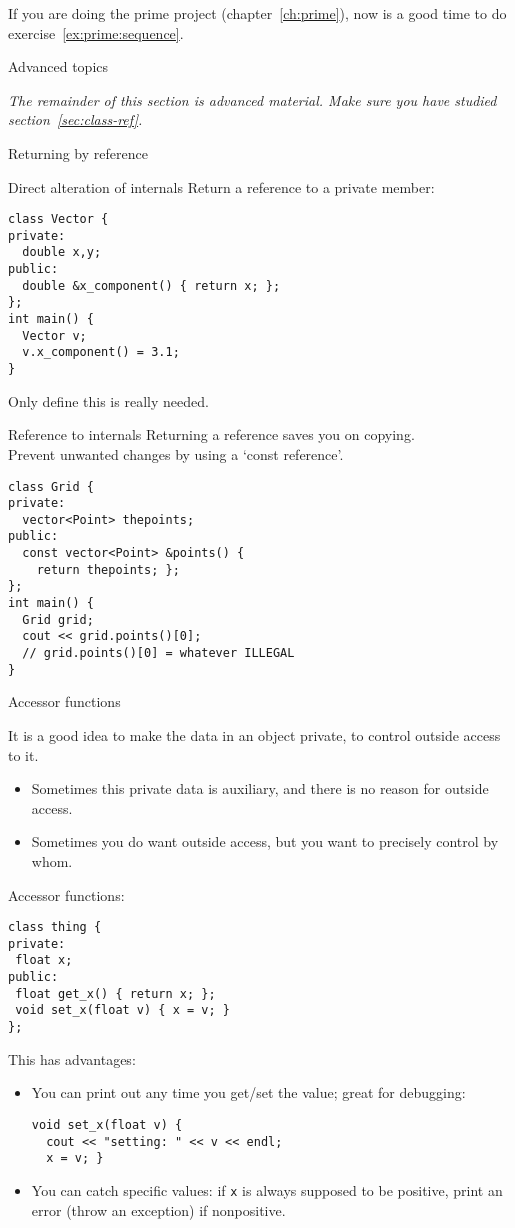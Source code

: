 \begin{exercise}
  If you are doing the prime project (chapter~\ref{ch:prime}),
  now is a good time to do exercise~\ref{ex:prime:sequence}.
\end{exercise}



 {Advanced topics}

\emph{The remainder of this section is advanced material. Make sure
  you have studied section~\ref{sec:class-ref}.}

 {Returning by reference}

\begin{block}{Direct alteration of internals}
  \label{sl:obj-return-ref}
  Return a reference to a private member:
\begin{lstlisting}
class Vector {
private:
  double x,y;
public:
  double &x_component() { return x; };
};
int main() {
  Vector v;
  v.x_component() = 3.1;
}
\end{lstlisting}
Only define this is really needed.
\end{block}

\begin{block}{Reference to internals}
  \label{sl:obj-return-const-ref}
  Returning a reference saves you on copying.\\
  Prevent unwanted changes by using a `const reference'.
\begin{lstlisting}
class Grid {
private:
  vector<Point> thepoints;
public:
  const vector<Point> &points() {
    return thepoints; };
};
int main() {
  Grid grid;
  cout << grid.points()[0];
  // grid.points()[0] = whatever ILLEGAL
}
\end{lstlisting}
\end{block}

 {Accessor functions}

It is a good idea to make the data in an object private,
to control outside access to it.
\begin{itemize}
\item Sometimes this private data is auxiliary, and there is no reason
  for outside access.
\item Sometimes you do want outside access, but you want to precisely
  control by whom.
\end{itemize}

Accessor functions:
\begin{lstlisting}
class thing {
private:
 float x;
public:
 float get_x() { return x; };
 void set_x(float v) { x = v; }
};
\end{lstlisting}
This has advantages:
\begin{itemize}
\item You can print out any time you get/set the value; great for
  debugging:
\begin{lstlisting}
void set_x(float v) {
  cout << "setting: " << v << endl;
  x = v; }
\end{lstlisting}
\item You can catch specific values: if \lstinline{x} is always supposed to be
  positive, print an error (throw an exception) if nonpositive.
\end{itemize}

